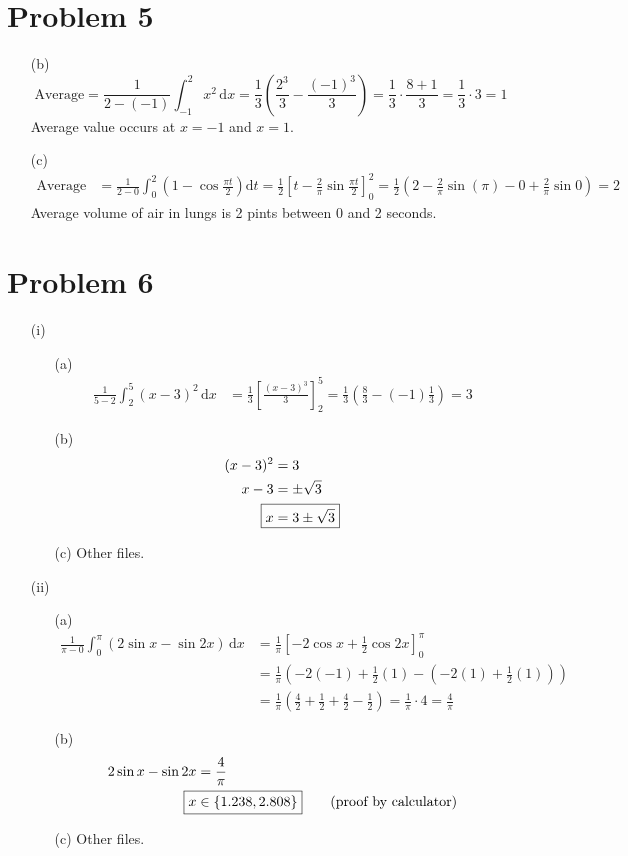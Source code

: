 \documentclass[preview, margin=0.6in]{standalone}
\newcommand*{\problem}[1]{\section*{Problem #1}}
\begin{document}
\problem{5}
\begin{itemize}
	\item[(b)]
		\begin{equation*}
			\text{Average}
			=\frac{1}{2-(-1)}\int_{-1}^{2}x^2\,\mathrm{d}x
			=\frac13\left(\frac{2^3}{3}-\frac{(-1)^3}{3}\right)
			=\frac13\cdot \frac{8+1}{3}
			=\frac13\cdot3
			=1
		\end{equation*}
		Average value occurs at $x=-1$ and $x=1$.
	\item[(c)]
		\begin{align*}
			\text{Average}
			&=\frac{1}{2-0}\int_{0}^{2}\left(1-\cos \frac{\pi t}{2}\right)\mathrm{d}t
			=\frac12 \left[t-\frac{2}{\pi}\sin \frac{\pi t}{2}\right]_{0}^{2}
			=\frac12 \left(2-\frac{2}{\pi}\sin(\pi)-0+\frac{2}{\pi}\sin0\right) 
			=2
		\end{align*}
		Average volume of air in lungs is 2 pints between 0 and 2 seconds.
\end{itemize}

\problem{6}
\begin{itemize}
	\item[(i)]
	\begin{itemize}
		\item[(a)]
			\begin{align*}
			    \frac{1}{5-2}\int_{2}^{5}(x-3)^2\,\mathrm{d}x
				&=\frac13 \left[\frac{(x-3)^3}{3}\right]_{2}^{5}
				=\frac13\left(\frac83-(-1)\frac{1}{3}\right)
				=\boxed{3}
			\end{align*}
		\item[(b)]
			\begin{align*}
				(x-3)^2&=3 \\ 
				x-3&=\pm\sqrt3 \\ 
				\Aboxed{x&=3\pm \sqrt{3}}
			\end{align*}
		\item[(c)] Other files.
	\end{itemize}

	\item[(ii)]
	\begin{itemize}
		\item[(a)]
			\begin{align*}
				\frac{1}{\pi-0}\int_{0}^{\pi}\left(2\sin x-\sin2x\right)\,\mathrm{d}x
				&=\frac{1}{\pi}\left[-2\cos x+\frac12\cos2x\right]_{0}^{\pi} \\
				&=\frac{1}{\pi}\left(-2(-1)+\frac12(1)-\left(-2(1)+\frac12(1)\right)\right) \\
				&=\frac{1}{\pi}\left(\frac42+\frac12+\frac42-\frac12\right)
				=\frac{1}{\pi}\cdot4
				=\boxed{\frac{4}{\pi}}
			\end{align*}
		\item[(b)]
			\begin{align*}
				2\sin x-\sin2x&=\frac{4}{\pi} \\ 
				\Aboxed{x&\in\left\{1.238, 2.808\right\}} \tag{proof by calculator}
			\end{align*}
		\item[(c)] Other files.
	\end{itemize}
\end{itemize}
\end{document}
